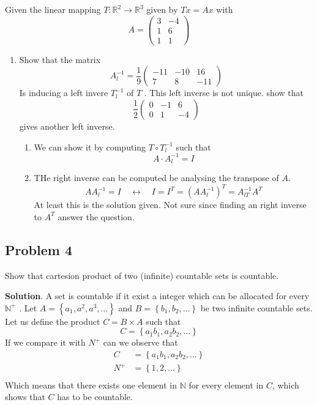 \documentclass{article}
\theoremstyle{remark}
\newcommand{\newpara}
  {
  \vskip 0.4cm
  }
\begin{document}
Given the linear mapping $T: \mathbb{R} ^2 \to  \mathbb{R} ^3$ given by $Tx = Ax$ with \[
A = \begin{pmatrix}
3  &  -4 \\
1  &  6 \\
1  &  1
\end{pmatrix} 
\]  
\begin{enumerate}
  \item Show that the matrix \[
  A_{l}^{-1} = \frac{1}{9}  \begin{pmatrix}
  -11  &  -10  &  16 \\
  7  &  8  &  -11
  \end{pmatrix} 
  \] 
  Is inducing a left invere $T^{-1} _{ l}  $ of $T$ . 
  This left inverse is not unique. show that \[
  \frac{1}{ 2}  \begin{pmatrix}
  0  &  -1  &  6\\
  0  &  1  &  -4
  \end{pmatrix} 
  \] 
  gives another left inverse.
  \begin{enumerate}
    \item We can show it by  computing $T \circ  T^{-1} _{ l}$ such that \[
    A \cdot  A^{-1} _{ l} = I
    \] 
  \item THe right inverse can be computed be analysing the transpose of $A$. \[
      A A^{-1}_{l} = I \quad  \leftrightarrow  \quad I=I^{T} = \left( A A^{-1}_{l} \right)^{T}   = A^{-1}_{lT} A^{T}
  \] 
  At least this is the solution given. Not sure since finding an right inverse to $A^{T}$ answer the question.
  \end{enumerate}
\end{enumerate}
\subsection{Problem 4}%
\label{sub:problem_4}
Show that cartesion product of two (infinite) countable sets is countable.

\newpara
\textbf{Solution}. A set is countable if it exist a integer which can be allocated for every $\mathbb{N}^{+} $ . Let $A = \left\{ a_{1} , a^{2} ,a^{3}, \ldots \right\}$  and $B = \left\{ b_{1}, b_{2}, \ldots \right\}$ be two infinite countable sets. Let us define the product $C = B \times A $ such that \[
C = \left\{ a_{1} b_{1}, a_{2} b_{2}, \ldots \right\}
\] 
If we compare it with $N^{+}$ can we observe that \[
\begin{split}
C  & = \left\{ a_{1} b_{1}, a_{2} b_{2}, \ldots \right\} \\
N^{+} &=  \left\{ 1,2, \ldots \right\} \\
\end{split} 
\] 
Which means that there exists one element in $\mathbb{N} $  for every element in $C$, which shows that $C$ has to be countable.
\end{document}
